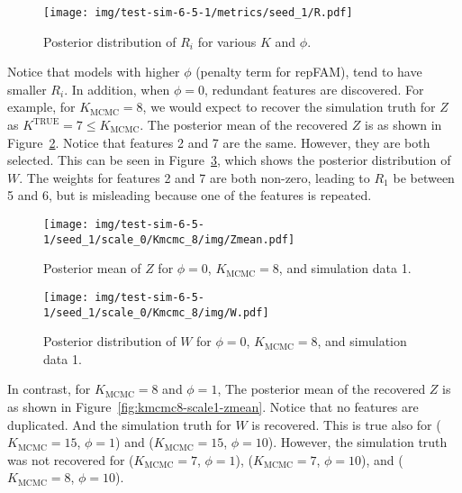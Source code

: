 \documentclass[12pt]{article} %
\def\true{\text{TRUE}}
\begin{document}
\begin{figure}[h]
  \begin{center}
    \texttt{[image: img/test-sim-6-5-1/metrics/seed\_1/R.pdf]}
  \end{center}
  \label{fig:R-post}
  \caption{Posterior distribution of $R_i$ for various $K$ and $\phi$.}
\end{figure}

Notice that models with higher $\phi$ (penalty term for repFAM), tend to have
smaller $R_i$. In addition, when $\phi=0$, redundant features are discovered.
For example, for $K_\text{MCMC} = 8$, we would expect to recover the simulation
truth for $Z$ as $K^\true = 7 \le K_\text{MCMC}$. The posterior mean of the
recovered $Z$ is as shown in Figure~\ref{fig:kmcmc8-scale0-zmean}. Notice that
features 2 and 7 are the same.  However, they are both selected. This can be seen
in Figure~\ref{fig:kmcmc8-scale0-w}, which shows the posterior distribution of $W$.
The weights for features 2 and 7 are both non-zero, leading to $R_1$ be between
5 and 6, but is misleading because one of the features is repeated.

\begin{figure}[h]
  \begin{center}
    \texttt{[image: img/test-sim-6-5-1/seed\_1/scale\_0/Kmcmc\_8/img/Zmean.pdf]}
  \end{center}
  \caption{Posterior mean of $Z$ for $\phi=0$, $K_\text{MCMC}=8$, and
  simulation data 1.}
  \label{fig:kmcmc8-scale0-zmean}
\end{figure}

\begin{figure}[h]
  \begin{center}
    \texttt{[image: img/test-sim-6-5-1/seed\_1/scale\_0/Kmcmc\_8/img/W.pdf]}
  \end{center}
  \caption{Posterior distribution of $W$ for $\phi=0$, $K_\text{MCMC}=8$, and
  simulation data 1.}
  \label{fig:kmcmc8-scale0-w}
\end{figure}

In contrast, for $K_\text{MCMC} = 8$ and $\phi=1$, The posterior mean of the
recovered $Z$ is as shown in Figure~\ref{fig:kmcmc8-scale1-zmean}. Notice that
no features are duplicated.  And the simulation truth for $W$ is recovered.
This is true also for ($K_\text{MCMC}=15$, $\phi=1$) and ($K_\text{MCMC}=15$,
$\phi=10$).  However, the simulation truth was not recovered for
($K_\text{MCMC}=7$, $\phi=1$), ($K_\text{MCMC}=7$, $\phi=10$), and
($K_\text{MCMC}=8$, $\phi=10$).
\end{document}
